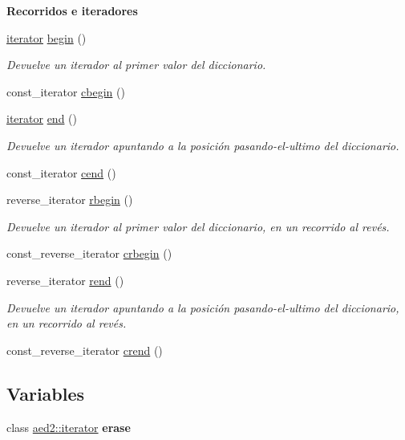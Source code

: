 \begin{Indent}{\bf \-Recorridos e iteradores}\par
\begin{DoxyCompactItemize}
\item 
\hyperlink{classaed2_1_1iterator}{iterator} \hyperlink{namespaceaed2_a669d2fcf59e6ec1fe40105ba395768b6}{begin} ()
\begin{DoxyCompactList}\small\item\em \-Devuelve un iterador al primer valor del diccionario. \end{DoxyCompactList}\item 
const\-\_\-iterator \hyperlink{namespaceaed2_ac1c803de21070eb6f9b7fa3e2035bc22}{cbegin} ()
\item 
\hyperlink{classaed2_1_1iterator}{iterator} \hyperlink{namespaceaed2_a3a9c18730be5c97fa5eafebd3aef61ed}{end} ()
\begin{DoxyCompactList}\small\item\em \-Devuelve un iterador apuntando a la posición pasando-\/el-\/ultimo del diccionario. \end{DoxyCompactList}\item 
const\-\_\-iterator \hyperlink{namespaceaed2_a82f5c60a3ebe119105e244fff3c90e20}{cend} ()
\item 
reverse\-\_\-iterator \hyperlink{namespaceaed2_a19713cdc443ce739325238c50f233717}{rbegin} ()
\begin{DoxyCompactList}\small\item\em \-Devuelve un iterador al primer valor del diccionario, en un recorrido al revés. \end{DoxyCompactList}\item 
const\-\_\-reverse\-\_\-iterator \hyperlink{namespaceaed2_a38b3285f169e2a78a3b561b5fee6027f}{crbegin} ()
\item 
reverse\-\_\-iterator \hyperlink{namespaceaed2_a161376ee8d17855224ab722ff9e0dd9a}{rend} ()
\begin{DoxyCompactList}\small\item\em \-Devuelve un iterador apuntando a la posición pasando-\/el-\/ultimo del diccionario, en un recorrido al revés. \end{DoxyCompactList}\item 
const\-\_\-reverse\-\_\-iterator \hyperlink{namespaceaed2_a3f4649ed2b93f1fdb07419fa1de0bf7f}{crend} ()
\end{DoxyCompactItemize}
\end{Indent}
\subsection*{\-Variables}
\begin{DoxyCompactItemize}
\item 
\hypertarget{namespaceaed2_ad4e768819128d9a5e85ad658ef19e766}{class \hyperlink{classaed2_1_1iterator}{aed2\-::iterator} {\bfseries erase}}\label{namespaceaed2_ad4e768819128d9a5e85ad658ef19e766}

\end{DoxyCompactItemize}


